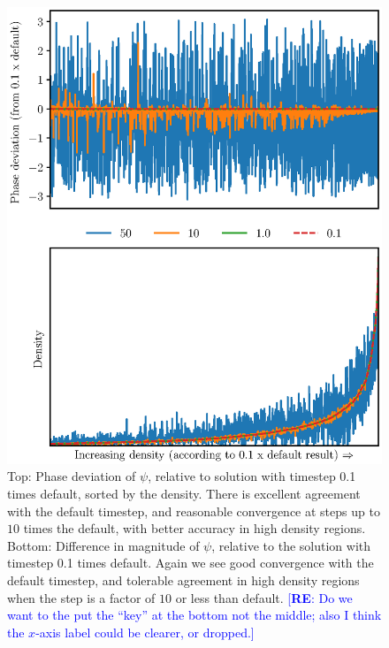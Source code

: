 \documentclass[a4paper,11pt]{article}
\newcommand{\re}[1]{\textcolor{blue}{[{\bf RE}: #1]}}
\begin{document}
\begin{figure} 
  \includegraphics[width=1.\textwidth,trim=0 1cm 0 2cm,clip]{combined}
  \caption{Top: Phase deviation of $\psi$, relative to solution with timestep 0.1 times default, sorted by the density. There is excellent agreement with the default timestep, and reasonable convergence at steps up to $10$ times the default, with better accuracy in high density regions. Bottom: Difference in magnitude of $\psi$, relative to the  solution with timestep 0.1 times default. Again we see good convergence with the default timestep, and tolerable agreement in high density regions when the step is a factor of $10$ or less than default. \re{Do we want to the put the ``key'' at the bottom not the middle; also I think the $x$-axis label could be clearer, or dropped.}}
  \label{fig:temporal}
\end{figure}
\end{document}
